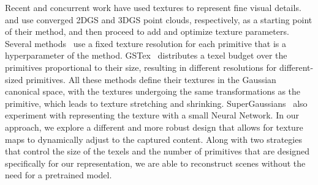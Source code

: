 Recent and concurrent work \cite{bbsplat, textured3dgs, supergaussians, gstex} have used textures to represent fine visual details.
\cite{gstex} and \cite{textured3dgs} use converged 2DGS and 3DGS point clouds, respectively,
as a starting point of their method, and then proceed to add and optimize texture parameters.
Several methods~\cite{bbsplat, textured3dgs, supergaussians} use a fixed texture resolution for each primitive that is a hyperparameter of the method. GSTex~\cite{gstex} distributes a texel budget over the primitives proportional to their size, resulting in different resolutions for different-sized primitives.
All these methods define their textures in the Gaussian canonical space, with the textures undergoing the same transformations as the primitive, which leads to texture stretching and shrinking.
SuperGaussians~\cite{supergaussians} also experiment with representing the texture with a small Neural Network.
In our approach,
we explore a different and more robust design that allows for texture maps to dynamically adjust to the captured content.
Along with two strategies that control the size of the texels and the number of primitives that are designed specifically for our representation,
we are able to reconstruct scenes without the need for a pretrained model.





